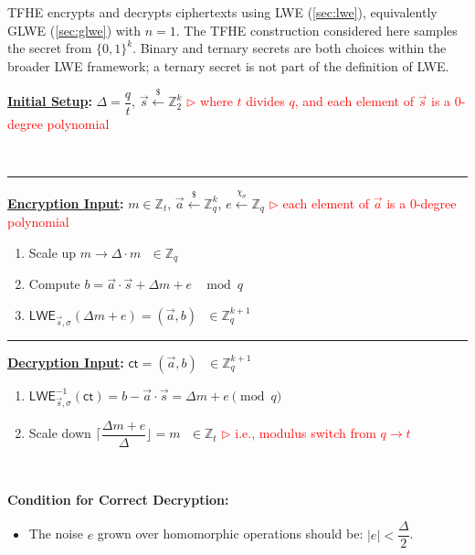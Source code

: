 TFHE encrypts and decrypts ciphertexts using LWE (\autoref{sec:lwe}), equivalently GLWE (\autoref{sec:glwe}) with $n=1$. The TFHE construction considered here samples the secret from $\{0,1\}^k$. Binary and ternary secrets are both choices within the broader LWE framework; a ternary secret is not part of the definition of LWE.


\begin{tcolorbox}[title={\textbf{\tboxlabel{\ref*{subsec:tfhe-enc-dec}} TFHE Encryption and Decryption}}]
\textbf{\underline{Initial Setup}:} $\Delta = \dfrac{q}{t}$, $\vec{s} \xleftarrow{\$} \mathbb{Z}_2^k$  \textcolor{red}{ $\rhd$ where $t$ divides $q$, and each element of $\vec{s}$ is a 0-degree polynomial}

$ $

\par\noindent\rule{\textwidth}{0.4pt}

\textbf{\underline{Encryption Input}:} $m \in \mathbb{Z}_t$, $\vec{a} \xleftarrow{\$} \mathbb{Z}_q^k$, $e \xleftarrow{\chi_\sigma} \mathbb{Z}_q$ \textcolor{red}{ $\rhd$ each element of $\vec{a}$ is a 0-degree polynomial}
\begin{enumerate}
\item Scale up $m \longrightarrow \Delta \cdot m \text{ } \in \mathbb{Z}_q$

\item Compute $b = \vec{a} \cdot \vec{s} + \Delta  m + e \text{ } \bmod q$
\item $\textsf{LWE}_{\vec{s},\sigma}(\Delta  m + e) = (\vec{a}, b) \text{ } \in \mathbb{Z}_q^{k + 1}$ 
\end{enumerate}

\par\noindent\rule{\textwidth}{0.4pt}

\textbf{\underline{Decryption Input}:} $\textsf{ct} = (\vec{a}, b) \text{ } \in \mathbb{Z}_q^{k+1}$
\begin{enumerate}
\item $\textsf{LWE}^{-1}_{\vec{s},\sigma}(\textsf{ct}) = b - \vec{a}\cdot \vec{s} = \Delta  m + e  \pmod q$

\item Scale down $\Bigg\lceil\dfrac{ \Delta  m + e } {\Delta}\Bigg\rfloor = m \text{ } \in \mathbb{Z}_t$ \textcolor{red}{ $\rhd$ i.e., modulus switch from $q \rightarrow t$}
\end{enumerate}

$ $

\textbf{{Condition for Correct Decryption}:}
\begin{itemize}
\item The noise $e$ grown over homomorphic operations should be: $|e| < \dfrac{\Delta}{2}$.
\end{itemize}

\end{tcolorbox}

